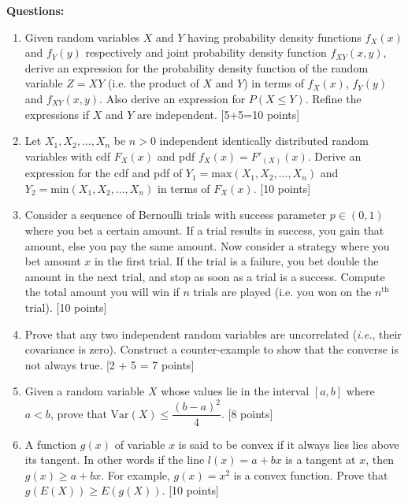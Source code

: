 \documentclass[11pt]{article}
\begin{document}
\textbf{Questions:}
\begin{enumerate}
\item Given random variables $X$ and $Y$ having probability density functions $f_X(x)$ and $f_Y(y)$ respectively and joint probability density function $f_{XY}(x,y)$, derive an expression for the probability density function of the random variable $Z = XY$ (i.e. the product of $X$ and $Y$) in terms of $f_X(x)$, $f_Y(y)$ and $f_{XY}(x,y)$. Also derive an expression for $P(X \leq Y)$. Refine the expressions if $X$ and $Y$ are independent. \textsf{[5+5=10 points]}

\item Let $X_1, X_2, ..., X_n$ be $n > 0$ independent identically distributed random variables with cdf $F_X(x)$ and pdf $f_X(x) = F'_(X)(x)$. Derive an expression for the cdf and pdf of $Y_1 = \textrm{max}(X_1, X_2, ..., X_n)$ and $Y_2 = \textrm{min}(X_1, X_2, ..., X_n)$ in terms of $F_X(x)$. \textsf{[10 points]}

\item Consider a sequence of Bernoulli trials with success parameter $p \in (0,1)$ where you bet a certain amount. If a trial results in success, you gain that amount, else you pay the same amount. Now consider a strategy where you bet amount $x$ in the first trial. If the trial is a failure, you bet double the amount in the next trial, and stop as soon as a trial is a success. Compute the total amount you will win if $n$ trials are played (i.e. you won on the $n^{\textrm{th}}$ trial). \textsf{[10 points]}

\item Prove that any two independent random variables are uncorrelated (\textit{i.e.}, their covariance is zero). Construct a counter-example to show that the converse is not always true. \textsf{[2 + 5 = 7 points]}

\item Given a random variable $X$ whose values lie in the interval $[a,b]$ where $a < b$, prove that $\textrm{Var}(X) \leq \dfrac{(b-a)^2}{4}$. \textsf{[8 points]}

\item A function $g(x)$ of variable $x$ is said to be convex if it always lies lies above its tangent. In other words if the line $l(x) = a + bx$ is a tangent at $x$, then $g(x) \geq a + bx$. For example, $g(x) = x^2$ is a convex function. Prove that $g(E(X)) \geq E(g(X))$.  \textsf{[10 points]}


\end{enumerate}
\end{document}
